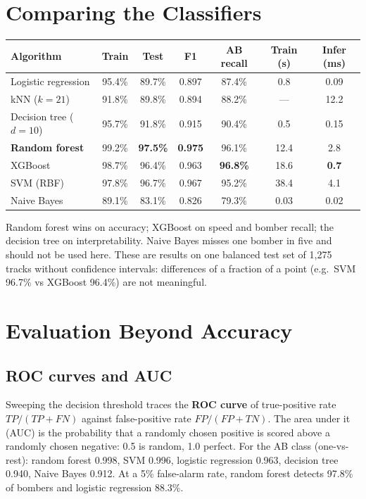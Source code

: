 \documentclass[11pt]{article}
\begin{document}
\section{Comparing the Classifiers}
\begin{center}\small\renewcommand{\arraystretch}{1.2}
\begin{tabular}{lcccccc}\toprule Algorithm & Train & Test & F1 & AB recall & Train (s) & Infer (ms)\\\midrule
Logistic regression & 95.4\% & 89.7\% & 0.897 & 87.4\% & 0.8 & 0.09\\ kNN ($k=21$) & 91.8\% & 89.8\% & 0.894 & 88.2\% & --- & 12.2\\ Decision tree ($d=10$) & 95.7\% & 91.8\% & 0.915 & 90.4\% & 0.5 & 0.15\\ \textbf{Random forest} & 99.2\% & \textbf{97.5\%} & \textbf{0.975} & 96.1\% & 12.4 & 2.8\\ XGBoost & 98.7\% & 96.4\% & 0.963 & \textbf{96.8\%} & 18.6 & \textbf{0.7}\\ SVM (RBF) & 97.8\% & 96.7\% & 0.967 & 95.2\% & 38.4 & 4.1\\ Naive Bayes & 89.1\% & 83.1\% & 0.826 & 79.3\% & 0.03 & 0.02\\\bottomrule\end{tabular}\end{center}
Random forest wins on accuracy; XGBoost on speed and bomber recall; the decision tree on interpretability. Naive Bayes misses one bomber in five and should not be used here. These are results on one balanced test set of 1,275 tracks without confidence intervals: differences of a fraction of a point (e.g.\ SVM 96.7\% vs XGBoost 96.4\%) are not meaningful.

\section{Evaluation Beyond Accuracy}
\subsection{ROC curves and AUC}
Sweeping the decision threshold traces the \textbf{ROC curve} of true-positive rate $TP/(TP+FN)$ against false-positive rate $FP/(FP+TN)$. The area under it (AUC) is the probability that a randomly chosen positive is scored above a randomly chosen negative: 0.5 is random, 1.0 perfect. For the AB class (one-vs-rest): random forest 0.998, SVM 0.996, logistic regression 0.963, decision tree 0.940, Naive Bayes 0.912. At a 5\% false-alarm rate, random forest detects 97.8\% of bombers and logistic regression 88.3\%.
\end{document}
